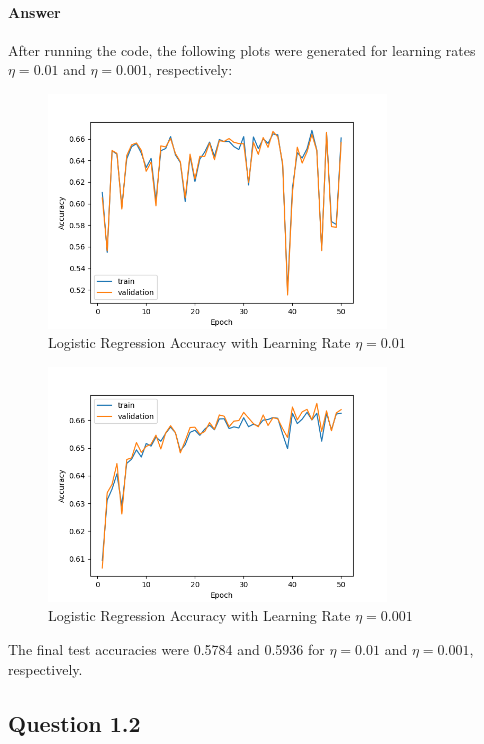 \documentclass{article}
\begin{document}
\paragraph{Answer} After running the code, the following plots were generated for learning rates $\eta = 0.01$ and $\eta = 0.001$, respectively:
\begin{figure}[H]
    \centering
    \includegraphics[width=0.8\textwidth]{"plots/1_1_b_001.png"}
    \caption{Logistic Regression Accuracy with Learning Rate $\eta = 0.01$}
    \label{1.1.b 0.01 Plot}
\end{figure}

\begin{figure}[H]
    \centering
    \includegraphics[width=0.8\textwidth]{"plots/1_1_b_0001.png"}
    \caption{Logistic Regression Accuracy with Learning Rate $\eta= 0.001$}
    \label{1.1.b 0.0001 Plot}
\end{figure}

The final test accuracies were 0.5784 and 0.5936 for $\eta = 0.01$ and $\eta = 0.001$, respectively.

\subsection{Question 1.2}
\end{document}
